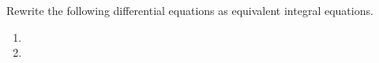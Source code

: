 Rewrite the following differential equations as equivalent integral equations.
\begin{enumerate}[label=(\alph*)]
    \item 
    \item 
\end{enumerate}